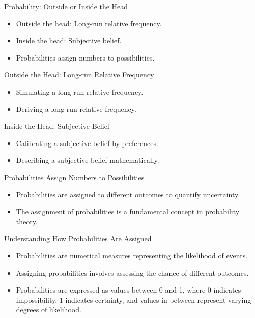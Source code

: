 \documentclass{beamer}
\begin{document}
\begin{frame}{Probability: Outside or Inside the Head}
  \begin{itemize}
    \item Outside the head: Long-run relative frequency.
    \item Inside the head: Subjective belief.
    \item Probabilities assign numbers to possibilities.
  \end{itemize}
\end{frame}

\begin{frame}{Outside the Head: Long-run Relative Frequency}
  \begin{itemize}
    \item Simulating a long-run relative frequency.
    \item Deriving a long-run relative frequency.
  \end{itemize}
\end{frame}

\begin{frame}{Inside the Head: Subjective Belief}
  \begin{itemize}
    \item Calibrating a subjective belief by preferences.
    \item Describing a subjective belief mathematically.
  \end{itemize}
\end{frame}

\begin{frame}{Probabilities Assign Numbers to Possibilities}
  \begin{itemize}
    \item Probabilities are assigned to different outcomes to quantify uncertainty.
    \item The assignment of probabilities is a fundamental concept in probability theory.
  \end{itemize}
\end{frame}

\begin{frame}{Understanding How Probabilities Are Assigned}
  \begin{itemize}
    \item Probabilities are numerical measures representing the likelihood of events.
    \item Assigning probabilities involves assessing the chance of different outcomes.
    \item Probabilities are expressed as values between 0 and 1, where 0 indicates impossibility, 1 indicates certainty, and values in between represent varying degrees of likelihood.
  \end{itemize}
\end{frame}
\end{document}
